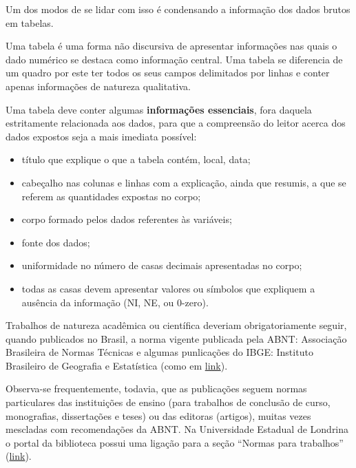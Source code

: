 \documentclass[
]{book}
\providecommand{\tightlist}{%
  \setlength{\itemsep}{0pt}\setlength{\parskip}{0pt}}
\begin{document}
\hfill\break

Um dos modos de se lidar com isso é condensando a informação dos dados brutos em tabelas.

\hfill\break

Uma tabela é uma forma não discursiva de apresentar informações nas quais o dado numérico se destaca como informação central. Uma tabela se diferencia de um quadro por este ter todos os seus campos delimitados por linhas e conter apenas informações de natureza qualitativa.

\hfill\break

Uma tabela deve conter algumas \textbf{informações essenciais}, fora daquela estritamente relacionada aos dados, para que a compreensão do leitor acerca dos dados expostos seja a mais imediata possível:

\hfill\break

\begin{itemize}
\tightlist
\item
  título que explique o que a tabela contém, local, data;
\item
  cabeçalho nas colunas e linhas com a explicação, ainda que resumis, a que se referem as quantidades expostas no corpo;
\item
  corpo formado pelos dados referentes às variáveis;
\item
  fonte dos dados;
\item
  uniformidade no número de casas decimais apresentadas no corpo;
\item
  todas as casas devem apresentar valores ou símbolos que expliquem a ausência da informação (NI, NE, ou 0-zero).
\end{itemize}

\hfill\break

Trabalhos de natureza acadêmica ou científica deveriam obrigatoriamente seguir, quando publicados no Brasil, a norma vigente publicada pela ABNT: Associação Brasileira de Normas Técnicas e algumas punlicações do IBGE: Instituto Brasileiro de Geografia e Estatística (como em \href{https://biblioteca.ibge.gov.br/visualizacao/livros/liv23907.pdf}{link}).

\hfill\break

Observa-se frequentemente, todavia, que as publicações seguem normas particulares das instituições de ensino (para trabalhos de conclusão de curso, monografias, dissertações e teses) ou das editoras (artigos), muitas vezes mescladas com recomendações da ABNT. Na Universidade Estadual de Londrina o portal da biblioteca possui uma ligação para a seção ``Normas para trabalhos'' (\href{https://sites.uel.br/bibliotecas/}{link}).
\end{document}
